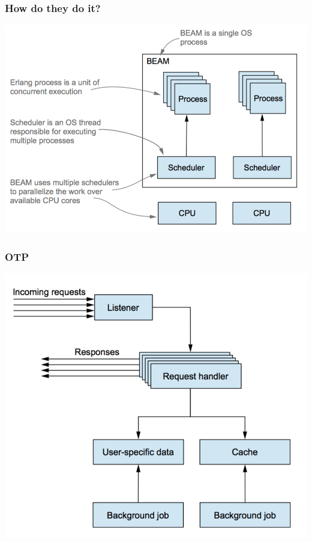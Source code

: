 \documentclass{beamer}
\begin{document}
\begin{frame}
  \frametitle{How do they do it?}
  \begin{center}
    \includegraphics[scale=.5]{beam.png}
  \end{center}
\end{frame}

\begin{frame}
  \frametitle{OTP}
  \begin{center}
    \includegraphics[scale=.5]{otp.png}
  \end{center}
\end{frame}
\end{document}

